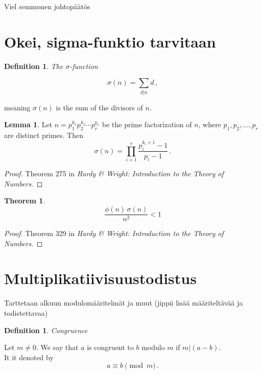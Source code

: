 \documentclass{article}
\theoremstyle{definition}
\newtheorem{definition}[subsection]{Definition}
\newtheorem{lemma}[subsubsection]{Lemma}
\newtheorem{theorem}[subsection]{Theorem}
\begin{document}
Viel semmonen johtopäätös

\section{Okei, sigma-funktio tarvitaan}

\begin{definition}{\emph{The $\sigma$-function}}

\begin{equation*}
    \sigma(n)=\sum_{d\vert n} d\,,
\end{equation*}

meaning $\sigma(n)$ is the sum of the divisors of $n$.
\end{definition}

\begin{lemma}
\label{lemma:sigma}
Let $n=p_1^{k_1}p_2^{k_2}\cdots p_r^{k_r}$ be the prime factorization of $n$, where $p_1,p_2,...,p_r$ are distinct primes. Then
\begin{equation*}
    \sigma(n)=\prod_{i=1}^r \frac{p_i^{k_i+1}-1}{p_i-1}\,.
\end{equation*}

\begin{proof}
Theorem 275 in \textit{Hardy \& Wright: Introduction to the Theory of Numbers}.
\end{proof}
\end{lemma}

\begin{theorem}
\label{thm:sigmafii}
\begin{equation*}
    \frac{\phi(n)\,\sigma(n)}{n^2}<1
\end{equation*}

\begin{proof}
Theorem 329 in \textit{Hardy \& Wright: Introduction to the Theory of Numbers}.
\end{proof}
\end{theorem}

\section{Multiplikatiivisuustodistus}

Tarttetaan alkuun modulomääritelmät ja muut (jippii lisää määriteltävää ja todistettavaa)

\begin{definition}{\emph{Congruence}}

Let $m \not = 0$. We say that $a$ is congruent to $b$ modulo $m$ if $m\vert (a-b)$.\\It it denoted by
\begin{equation*}
    a \equiv b \pmod{m}\,.
\end{equation*}
\end{definition}
\end{document}
